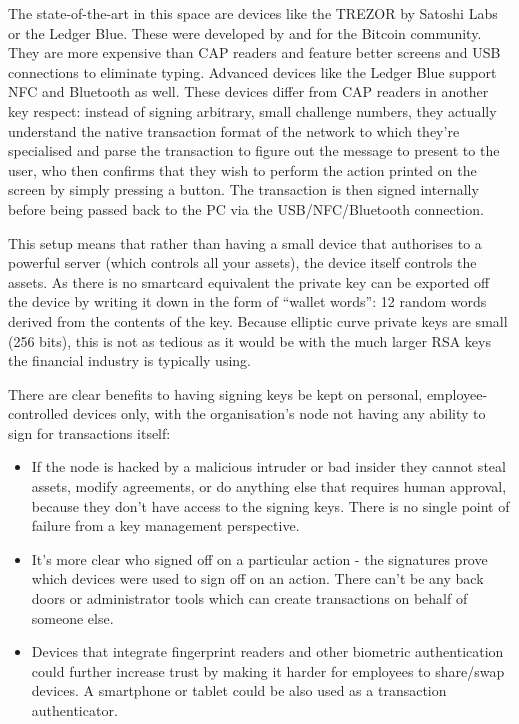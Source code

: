 \documentclass{article}
\begin{document}
The state-of-the-art in this space are devices like the TREZOR\cite{TREZOR} by Satoshi Labs or the Ledger Blue. These
were developed by and for the Bitcoin community. They are more expensive than CAP readers and feature better
screens and USB connections to eliminate typing. Advanced devices like the Ledger Blue support NFC and
Bluetooth as well. These devices differ from CAP readers in another key respect: instead of signing arbitrary, small
challenge numbers, they actually understand the native transaction format of the network to which they're specialised and parse the
transaction to figure out the message to present to the user, who then confirms that they wish to perform the action
printed on the screen by simply pressing a button. The transaction is then signed internally before being passed back to
the PC via the USB/NFC/Bluetooth connection.

This setup means that rather than having a small device that authorises to a powerful server (which controls all your
assets), the device itself controls the assets. As there is no smartcard equivalent the private key can be exported off
the device by writing it down in the form of ``wallet words'': 12 random words derived from the contents of the key.
Because elliptic curve private keys are small (256 bits), this is not as tedious as it would be with the much larger RSA
keys the financial industry is typically using.

There are clear benefits to having signing keys be kept on personal, employee-controlled devices only, with the organisation's
node not having any ability to sign for transactions itself:

\begin{itemize}
\item If the node is hacked by a malicious intruder or bad insider they cannot steal assets, modify agreements,
or do anything else that requires human approval, because they don't have access to the signing keys. There is no single
point of failure from a key management perspective.
\item It's more clear who signed off on a particular action - the signatures prove which devices were used to sign off
on an action. There can't be any back doors or administrator tools which can create transactions on behalf of someone else.
\item Devices that integrate fingerprint readers and other biometric authentication could further increase trust by
making it harder for employees to share/swap devices. A smartphone or tablet could be also used as a transaction authenticator.
\end{itemize}
\end{document}
